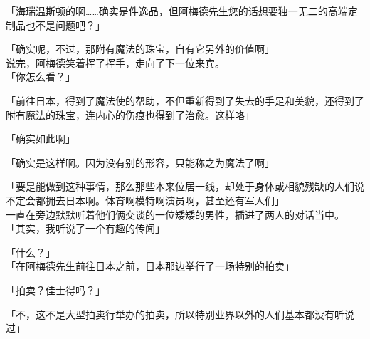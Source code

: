 「海瑞温斯顿的啊……确实是件逸品，但阿梅德先生您的话想要独一无二的高端定制品也不是问题吧？」

「确实呢，不过，那附有魔法的珠宝，自有它另外的价值啊」\\

说完，阿梅德笑着挥了挥手，走向了下一位来宾。\\

「你怎么看？」

「前往日本，得到了魔法使的帮助，不但重新得到了失去的手足和美貌，还得到了附有魔法的珠宝，连内心的伤痕也得到了治愈。这样咯」

「确实如此啊」

「确实是这样啊。因为没有别的形容，只能称之为魔法了啊」

「要是能做到这种事情，那么那些本来位居一线，却处于身体或相貌残缺的人们说不定会都拥去日本啊。体育啊模特啊演员啊，甚至还有军人们」\\

一直在旁边默默听着他们俩交谈的一位矮矮的男性，插进了两人的对话当中。\\

「其实，我听说了一个有趣的传闻」

「什么？」\\

「在阿梅德先生前往日本之前，日本那边举行了一场特别的拍卖」

「拍卖？佳士得吗？」

「不，这不是大型拍卖行举办的拍卖，所以特别业界以外的人们基本都没有听说过」

